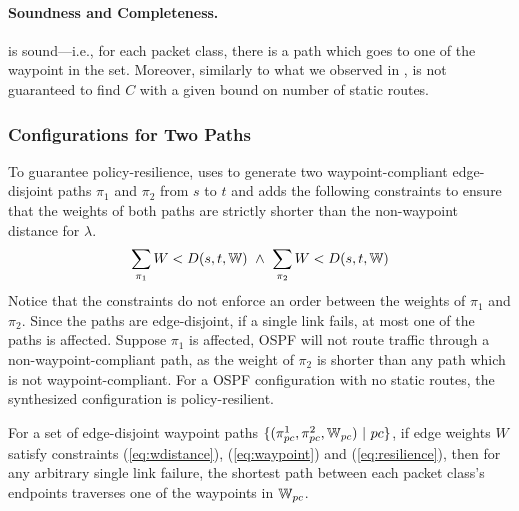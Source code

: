 \paragraph{Soundness and Completeness.}
 is sound---i.e., for each packet class, there is a 
path which goes to one of the waypoint in the set.  
Moreover, similarly to what we observed in ,  is not 
guaranteed to find $C$ with a given bound on number of static routes.


\subsubsection{Configurations for Two Paths} \label{sec:ospfresilience}
To guarantee policy-resilience, \name
uses \genesis to generate two waypoint-compliant 
edge-disjoint paths $\pi_1$ and $\pi_2$ from $s$ to $t$
and
adds the following constraints
 to ensure that the  weights 
of both paths are strictly shorter than 
the non-waypoint distance for $\lambda$. 
\begin{equation} \label{eq:resilience}
\sum_{\pi_1}W < D(s,t,\mathbb{W}) ~\wedge~ \sum_{\pi_2}W < D(s,t,\mathbb{W}) 
\end{equation}
Notice that the constraints do not enforce an order between the weights of $\pi_1$ and $\pi_2$.
Since the paths are edge-disjoint, if a single link fails, at most one 
of the paths is affected. Suppose
$\pi_1$ is affected, OSPF will not route traffic through a  
non-waypoint-compliant path, as the weight of $\pi_2$ is shorter 
than any path which is not waypoint-compliant. 
For a OSPF configuration with no static routes,
the synthesized configuration is policy-resilient. 

\iffull
\begin{theorem}
	For a set of edge-disjoint waypoint paths $\{(\pi^1_{pc}, \pi^2_{pc}, \mathbb{W}_{pc}) ~|~ pc\}$, 
	if edge weights $W$ satisfy constraints (\ref{eq:wdistance}), (\ref{eq:waypoint}) and
	(\ref{eq:resilience}), 
	then for any arbitrary single link failure, 
	the shortest path between each packet class's 
	endpoints traverses one of the waypoints in $\mathbb{W}_{pc}$.
\end{theorem}

\fi

